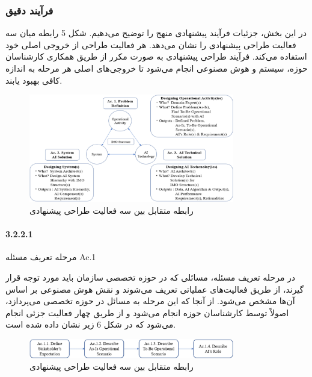 \documentclass[a4paper,10pt]{article}
\begin{document}
            \subsubsection{فرآیند دقیق}

                در این بخش، جزئیات فرآیند پیشنهادی منهج را توضیح می‌دهیم. شکل 5 رابطه میان سه فعالیت طراحی پیشنهادی را نشان می‌دهد. هر فعالیت طراحی از خروجی اصلی خود استفاده می‌کند. فرآیند طراحی پیشنهادی به صورت مکرر از طریق همکاری کارشناسان حوزه، سیستم و هوش مصنوعی انجام می‌شود تا خروجی‌های اصلی هر مرحله به اندازه کافی بهبود یابند.

                \begin{figure}[htbp]

                    \centering
                    \includegraphics[width=0.8\textwidth]{image/fig 5.png}
                    \caption{رابطه متقابل بین سه فعالیت طراحی پیشنهادی}
                    \label{fig:fig_5}
                
                \end{figure}

                \paragraph{3.2.2.1}{مرحله تعریف مسئله Ac.1}

                    در مرحله تعریف مسئله، مسائلی که در حوزه تخصصی سازمان باید مورد توجه قرار گیرند، از طریق فعالیت‌های عملیاتی تعریف می‌شوند و نقش هوش مصنوعی بر اساس آن‌ها مشخص می‌شود. از آنجا که این مرحله به مسائل در حوزه تخصصی می‌پردازد، اصولاً توسط کارشناسان حوزه انجام می‌شود و از طریق چهار فعالیت جزئی انجام می‌شود که در شکل 6 زیر نشان داده شده است.

                    \begin{figure}[htbp]

                        \centering
                        \includegraphics[width=0.8\textwidth]{image/fig 6.png}
                        \caption{رابطه متقابل بین سه فعالیت طراحی پیشنهادی}
                        \label{fig:fig_6}
                    
                    \end{figure}
\end{document}
